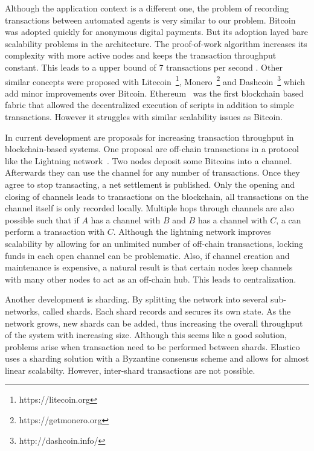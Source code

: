 Although the application context is a different one, the problem of recording transactions between
automated agents is very similar to our problem. Bitcoin was adopted quickly for anonymous digital 
payments. But its adoption layed bare scalability problems in the architecture. The proof-of-work
algorithm increases its complexity with more active nodes and keeps the transaction throughput 
constant. This leads to a upper bound of 7 transactions per second \cite{bitcoin_throughput}. 
Other similar concepts were proposed with Litecoin~\footnote{https://litecoin.org}, Monero~\footnote{https://getmonero.org}
and Dashcoin~\footnote{http://dashcoin.info/} which add minor improvements over Bitcoin.
Ethereum~\cite{wood2014ethereum} was the first blockchain based fabric that allowed the decentralized
execution of scripts in addition to simple transactions. However it struggles with similar scalability
issues as Bitcoin.

In current development are proposals for increasing transaction throughput in blockchain-based 
systems. One proposal are off-chain transactions in a protocol like the Lightning network~\cite{poon2016bitcoin}.
Two nodes deposit some Bitcoins into a channel. Afterwards they can use the channel for any number
of transactions. Once they agree to stop transacting, a net settlement is published. Only the 
opening and closing of channels leads to transactions on the blockchain, all transactions on the 
channel itself is only recorded locally. Multiple hops through channels are also possible such that 
if $A$ has a channel with $B$ and $B$ has a channel with $C$, a can perform a transaction with $C$. 
Although the lightning network improves scalability by allowing for an unlimited number of off-chain 
transactions, locking funds in each open channel can be problematic. Also, if channel creation and 
maintenance is expensive, a natural result is that certain nodes keep channels with many other 
nodes to act as an off-chain hub. This leads to centralization.

Another development is sharding. By splitting the network into several sub-networks, called shards.
Each shard records and secures its own state. As the network grows, new shards can be added, thus 
increasing the overall throughput of the system with increasing size. Although this seems like a 
good solution, problems arise when transaction need to be performed between shards. Elastico~\cite{luu2016secure}
uses a sharding solution with a Byzantine consensus scheme and allows for almost linear scalabilty.
However, inter-shard transactions are not possible.

